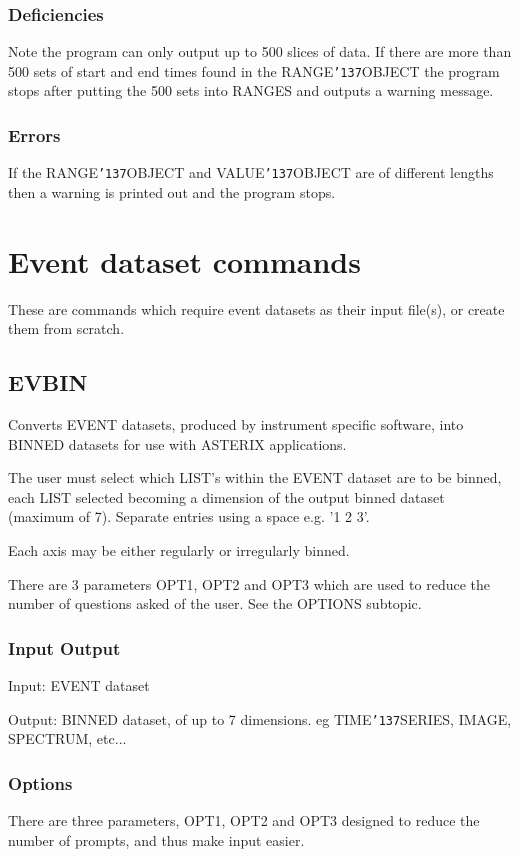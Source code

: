 \documentclass{book}
\renewcommand{\_}{{\tt\char'137}}     %
\begin{document}
\subsection{Deficiencies}
Note the program can only output up to 500 slices of data. If
there are more than 500 sets of start and end times found in the
RANGE\_OBJECT the program stops after putting the 500 sets into
RANGES and outputs a warning message.
 
\subsection{Errors}
If the RANGE\_OBJECT and VALUE\_OBJECT are of different lengths
then a warning is printed out and the program stops.
 
\chapter{Event dataset commands}
These are commands which require event datasets as their input
file(s), or create them from scratch.
 
\section{EVBIN}
Converts EVENT datasets, produced by instrument specific
software, into BINNED datasets for use with ASTERIX applications.
 
The user must select which LIST's within the EVENT dataset are to
be binned, each LIST selected becoming a dimension of the output
binned dataset (maximum of 7). Separate entries using a space
e.g. '1 2 3'.
 
Each axis may be either regularly or irregularly binned.
 
There are 3 parameters OPT1, OPT2 and OPT3 which are used to reduce
the number of questions asked of the user. See the OPTIONS
subtopic.
 
\subsection{Input Output}
Input: EVENT dataset
 
Output: BINNED dataset, of up to 7 dimensions.
eg TIME\_SERIES, IMAGE, SPECTRUM, etc...
 
\subsection{Options}
There are three parameters, OPT1, OPT2 and OPT3 designed to reduce
the number of prompts, and thus make input easier.
 
\end{document}
